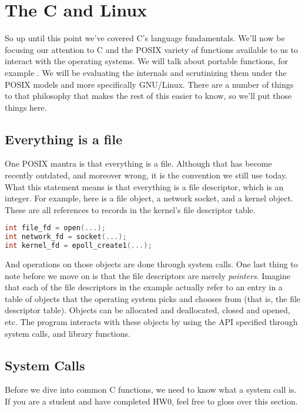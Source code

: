 \section{The C and Linux}

So up until this point we've covered C's language fundamentals.
We'll now be focusing our attention to C and the POSIX variety of functions available to us to interact with the operating systems.
We will talk about portable functions, for example  .
We will be evaluating the internals and scrutinizing them under the POSIX models and more specifically GNU/Linux.
There are a number of things to that philosophy that makes the rest of this easier to know, so we'll put those things here.

\subsection{Everything is a file}

One POSIX mantra is that everything is a file.
Although that has become recently outdated, and moreover wrong, it is the convention we still use today.
What this statement means is that everything is a file descriptor, which is an integer. For example, here is a file object, a network socket, and a kernel object. These are all references to records in the kernel's file descriptor table.

\begin{lstlisting}[language=C]
int file_fd = open(...);
int network_fd = socket(...);
int kernel_fd = epoll_create1(...);
\end{lstlisting}

And operations on those objects are done through system calls.
One last thing to note before we move on is that the file descriptors are merely \textit{pointers}.
Imagine that each of the file descriptors in the example actually refer to an entry in a table of objects that the operating system picks and chooses from (that is, the file descriptor table).
Objects can be allocated and deallocated, closed and opened, etc.
The program interacts with these objects by using the API specified through system calls, and library functions.

\subsection{System Calls}

Before we dive into common C functions, we need to know what a system call is.
If you are a student and have completed HW0, feel free to gloss over this section.

